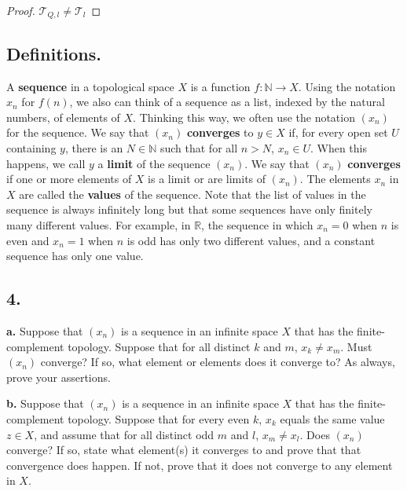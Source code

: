 \documentclass{amsart}
\theoremstyle{plain}
\theoremstyle{definition}
\theoremstyle{remark}
\begin{document}
\begin{proof}{$\mathcal T_{Q,l}\not= \mathcal T_l$}
    
 



\end{proof}



\subsection*{Definitions.} A {\bfseries sequence} in a topological space $X$ is a function $f : \mathbb N \rightarrow X$. Using the notation $x_n$ for $f(n)$, we also can think of a sequence as a list, indexed by the natural numbers, of elements of $X$. Thinking this way, we often use the notation $(x_n)$ for the sequence. We say that $(x_n)$ {\bfseries converges} to $y\in X$ if, for every open set $U$ containing $y$, there is an $N\in \mathbb N$ such that for all $n > N$, $x_n \in U$. When this happens, we call $y$ a {\bfseries limit} of the sequence $(x_n)$. We say that $(x_n)$ {\bfseries converges} if one or more elements of $X$ is a limit or are limits of $(x_n)$. The elements $x_n$ in $X$ are called the {\bfseries values} of the sequence. Note that the list of values in the sequence is always infinitely long but that some sequences have only finitely many different values. For example, in $\mathbb R$, the sequence in which $x_n = 0$ when $n$ is even and $x_n = 1$ when $n$ is odd has only two different values, and a constant sequence has only one value.

\vspace{.15in}

\noindent
\subsection*{4.}

{\bfseries a.} Suppose that $(x_n)$ is a sequence in an infinite space $X$ that has the finite-complement topology. Suppose that for all distinct $k$ and $m$, $x_k\ne x_m$. Must $(x_n)$ converge? If so, what element or elements does it converge to? As always, prove your assertions.

\vspace{.1in}
{\bfseries b.} Suppose that $(x_n)$ is a sequence in an infinite space $X$ that has the finite-complement topology. Suppose that for every even $k$, $x_k$ equals the same value $z\in X$, and assume that for all distinct odd $m$ and $l$, $x_m \ne x_l$. Does $(x_n)$ converge? If so, state what element(s) it converges to and prove that that convergence does happen. If not, prove that it does not converge to any element in $X$.
\end{document}
